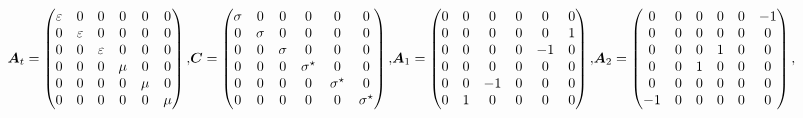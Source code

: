\begin{subequations}
	\begin{align}
		\At =
		\begin{pmatrix}
			\EPrm & 0 & 0 & 0 & 0 & 0 \\
			0 & \EPrm & 0 & 0 & 0 & 0 \\
			0 & 0 & \EPrm & 0 & 0 & 0 \\
			0 & 0 & 0 & \HPrm & 0 & 0 \\
			0 & 0 & 0 & 0 & \HPrm & 0 \\
			0 & 0 & 0 & 0 & 0 & \HPrm
		\end{pmatrix}
		\label{eq:matrice_at} ,
	\end{align}
	\begin{align}
		\ACnd =
		\begin{pmatrix}
			\ECnd & 0 & 0 & 0 & 0 & 0 \\
			0 & \ECnd & 0 & 0 & 0 & 0 \\
			0 & 0 & \ECnd & 0 & 0 & 0 \\
			0 & 0 & 0 & \HCnd & 0 & 0 \\
			0 & 0 & 0 & 0 & \HCnd & 0 \\
			0 & 0 & 0 & 0 & 0 & \HCnd
		\end{pmatrix}
		\label{eq:matrice_sigma} ,
	\end{align}
	\begin{align}
		\Ac{1} =
		\begin{pmatrix}
			0 & 0 & 0 & 0 & 0 & 0 \\
			0 & 0 & 0 & 0 & 0 & 1 \\
			0 & 0 & 0 & 0 & -1 & 0 \\
			0 & 0 & 0 & 0 & 0 & 0 \\
			0 & 0 & -1 & 0 & 0 & 0 \\
			0 & 1 & 0 & 0 & 0 & 0
		\end{pmatrix}
		\label{eq:matrice_a1} ,
	\end{align}
	\begin{align}
		\Ac{2} =
		\begin{pmatrix}
			0 & 0 & 0 & 0 & 0 & -1 \\
			0 & 0 & 0 & 0 & 0 & 0 \\
			0 & 0 & 0 & 1 & 0 & 0 \\
			0 & 0 & 1 & 0 & 0 & 0 \\
			0 & 0 & 0 & 0 & 0 & 0 \\
			-1 & 0 & 0 & 0 & 0 & 0
		\end{pmatrix}
		\label{eq:matrice_a2} ,
	\end{align}

\end{subequations}
